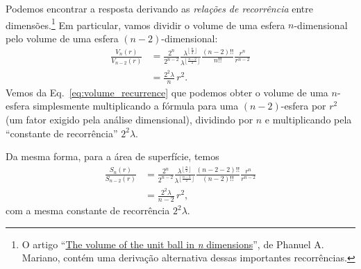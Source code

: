 Podemos encontrar a resposta derivando as \emph{relações de recorrência} entre dimensões.\footnote{O artigo ``\href{http://www2.math.uconn.edu/~mariano/research/MathClubsp14\%20.pdf}{The volume of the unit ball in \emph{n} dimensions}'', de Phanuel A. Mariano, contém uma derivação alternativa dessas importantes recorrências.} Em particular, vamos dividir o volume de uma esfera $n$-dimensional pelo volume de uma esfera $(n-2)$-dimensional:
\begin{equation}
\label{eq:volume_recurrence}
\begin{split}
\frac{V_n(r)}{V_{n-2}(r)} & =
\frac{2^n}{2^{n-2}}
\frac{\lambda^{\left\lfloor \frac{n}{2} \right\rfloor}}{\lambda^{\left\lfloor \frac{n-2}{2} \right\rfloor}}
\frac{(n-2)!!}{n!!}
\frac{r^{n}}{r^{n-2}}
\\ & = \frac{2^2\lambda}{n}\,r^2.
\end{split}
\end{equation}
Vemos da Eq.~\eqref{eq:volume_recurrence} que podemos obter o volume de uma $n$-esfera simplesmente multiplicando a fórmula para uma $(n-2)$-esfera por $r^2$ (um fator exigido pela análise dimensional), dividindo por $n$ e multiplicando pela ``constante de recorrência'' $2^2\lambda$.

Da mesma forma, para a área de superfície, temos
\begin{equation}
\label{eq:surface_area_recurrence}
\begin{split}
\frac{S_n(r)}{S_{n-2}(r)} & =
\frac{2^n}{2^{n-2}}
\frac{\lambda^{\left\lfloor \frac{n}{2} \right\rfloor}}{\lambda^{\left\lfloor \frac{n-2}{2} \right\rfloor}}
\frac{(n-2-2)!!}{(n-2)!!}
\frac{r^{n}}{r^{n-2}}
\\ & = \frac{2^2\lambda}{n-2}\,r^2,
\end{split}
\end{equation}
com a mesma constante de recorrência $2^2\lambda$.

